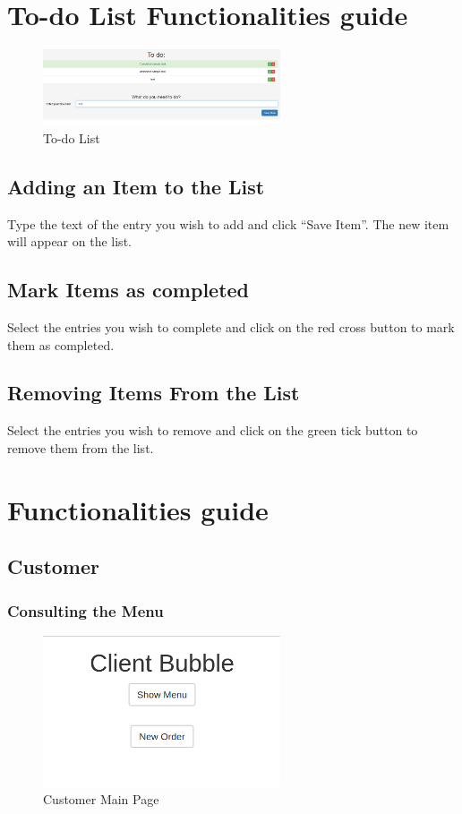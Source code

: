 \section{To-do List Functionalities guide}
\begin{figure}[H]
	\centering
	\includegraphics[width=7cm]{../../documenti/UserManualDemo/demo_screens/todo.png}
	\caption{To-do List}
\end{figure}
\subsection{Adding an Item to the List}
Type the text of the entry you wish to add and click ``Save Item''. The new item will appear on the list.
\subsection{Mark Items as completed}
Select the entries you wish to complete and click on the red cross button to mark them as completed. 
\subsection{Removing Items From the List}
Select the entries you wish to remove and click on the green tick button to remove them from the list.

\section{\DemoName{} Functionalities guide}
\subsection{Customer}
\subsubsection{Consulting the Menu}
\begin{figure}[H]
	\centering
	\includegraphics[width=7cm]{../../documenti/UserManualDemo/demo_screens/client_main.png}
	\caption{Customer Main Page}
\end{figure}
